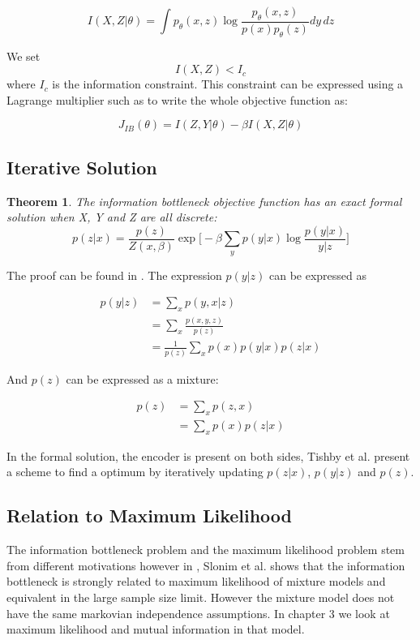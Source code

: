 \documentclass[11pt,oneside,openright]{report}
\newtheorem{theorem}{Theorem}
\begin{document}
$$ I(X, Z|\theta) = \int p_\theta(x, z) \log \frac{p_\theta(x, z)}{p(x)p_\theta(z)} dy\,dz $$

We set $$I(X, Z) < I_c$$ where $I_c$ is the information constraint. This constraint can be expressed using a Lagrange multiplier such as to write the whole objective function as:

$$ J_{IB}(\theta) = I(Z, Y|\theta) - \beta I(X, Z|\theta)$$


\subsection{Iterative Solution}
\begin{theorem}
The information bottleneck objective function has an exact formal solution when X, Y and Z are all discrete:
$$ p(z|x) = \frac{p(z)}{Z(x, \beta)} \exp\Big[-\beta \sum_y p(y|x) \log\frac{p(y|x)}{y|z}\Big] $$
\end{theorem}

The proof can be found in \cite{tishby}. The expression $p(y|z)$ can be expressed as 
 
 \begin{align}
p(y|z) &= \sum_x p(y, x|z)  \\
	 & = \sum_x \frac{p(x ,y, z)}{p(z)} \\
	 &= \frac{1}{p(z)} \sum_x p(x) p(y|x) p (z|x) 
\label{eq:y_given_z}
\end{align}

And $p(z)$ can be expressed as a mixture:
 
  \begin{align}
p(z) &= \sum_x p(z, x)  \\
	 &= \sum_x p(x) p(z|x)
\label{eq:z_post}
\end{align}

In the formal solution, the encoder is present on both sides, Tishby et al. present a scheme to find a optimum by iteratively updating $p(z|x)$, $p(y|z)$ and $p(z)$.

\subsection{Relation to Maximum Likelihood}
The information bottleneck problem and the maximum likelihood problem stem from different motivations however in \cite{ib_ml}, Slonim et al. shows that the information bottleneck is strongly related to maximum likelihood of mixture models and equivalent in the large sample size limit. However the mixture model does not have the same markovian independence assumptions. In chapter 3 we look at maximum likelihood and mutual information in that model.
\end{document}
